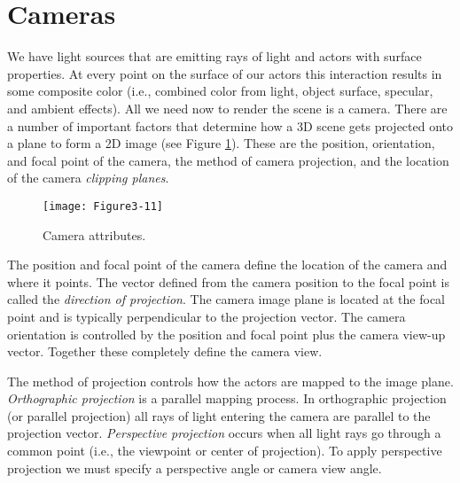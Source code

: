 \section{Cameras}
\label{sec:cameras}

We have light sources that are emitting rays of light and actors with surface properties. At every point on the surface of our actors this interaction results in some composite color (i.e., combined color from light, object surface, specular, and ambient effects). All we need now to render the scene is a camera. There are a number of important factors that determine how a 3D scene gets projected onto a plane to form a 2D image (see Figure \ref{fig:Figure3-11}). These are the position, orientation, and focal point of the camera, the method of camera projection, and the location of the camera \emph{clipping planes}.

\begin{figure}[!htb]
  \centering
  \texttt{[image: Figure3-11]}\\
  \caption{Camera attributes.}\label{fig:Figure3-11}
\end{figure}

The position and focal point of the camera define the location of the camera and where it points. The vector defined from the camera position to the focal point is called the \emph{direction of projection}. The camera image plane is located at the focal point and is typically perpendicular to the projection vector. The camera orientation is controlled by the position and focal point plus the camera view-up vector. Together these completely define the camera view. 

The method of projection controls how the actors are mapped to the image plane. \emph{Orthographic projection} is a parallel mapping process. In orthographic projection (or parallel projection) all rays of light entering the camera are parallel to the projection vector. \emph{Perspective projection} occurs when all light rays go through a common point (i.e., the viewpoint or center of projection). To apply perspective projection we must specify a perspective angle or camera view angle.


